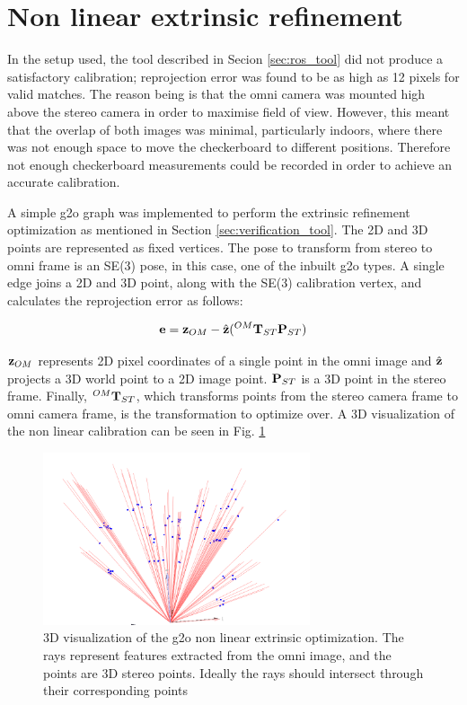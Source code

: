 \section{Non linear extrinsic refinement}
\label{sec:g2o_extrinsic_cal}

In the setup used, the tool described in Secion \ref{sec:ros_tool} did not produce a satisfactory calibration; reprojection error was found to be as high as 12 pixels for valid matches.  The reason being is that the omni camera was mounted high above the stereo camera in order to maximise field of view.  However, this meant that the overlap of both images was minimal, particularly indoors, where there was not enough space to move the checkerboard to different positions.  Therefore not enough checkerboard measurements could be recorded in order to achieve an accurate calibration.

A simple g2o graph was implemented to perform the extrinsic refinement optimization as mentioned in Section \ref{sec:verification_tool}.  The 2D and 3D points are represented as fixed vertices.  The pose to transform from stereo to omni frame is an SE(3) pose, in this case, one of the inbuilt g2o types.  A single edge joins a 2D and 3D point, along with the SE(3) calibration vertex, and calculates the reprojection error as follows:

\begin{align}
 \mathbf e = \mathbf z_{OM} - \hat{\mathbf z}( ^{OM}\mathbf T_{ST} \mathbf P_{ST})
\end{align}

$\mathbf z_{OM}$ represents 2D pixel coordinates of a single point in the omni image and $\hat{\mathbf z}$ projects a 3D world point to a 2D image point.  $\mathbf P_{ST}$ is a 3D point in the stereo frame. Finally, $^{OM}\mathbf T_{ST}$, which transforms points from the stereo camera frame to omni camera frame, is the transformation to optimize over.  A 3D visualization of the non linear calibration can be seen in Fig. \ref{fig:g2o_cal_vis}

\begin{figure}[h!]
  \centering
    \includegraphics[width=0.7\textwidth]{chapters/images/g2o_cal_vis}
  \caption{3D visualization of the g2o non linear extrinsic optimization.  The rays represent features extracted from the omni image, and the points are 3D stereo points.  Ideally the rays should intersect through their corresponding points}
  \label{fig:g2o_cal_vis}
\end{figure}

